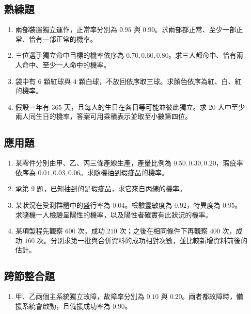 \documentclass[11pt,a4paper]{article}
\providecommand{\tightlist}{%
  \setlength{\itemsep}{0pt}\setlength{\parskip}{0pt}}
\begin{document}
\subsection{熟練題}\label{ux719fux7df4ux984c}

\begin{enumerate}
\def\labelenumi{\arabic{enumi}.}
\setcounter{enumi}{4}
\item
  兩部裝置獨立運作，正常率分別為 \(0.95\) 與 \(0.90\)。求兩部都正常、至少一部正常、恰有一部正常的機率。
\item
  三位選手獨立命中目標的機率依序為 \(0.70,0.60,0.80\)。求三人都命中、恰有兩人命中、至少一人命中的機率。
\item
  袋中有 \(6\) 顆紅球與 \(4\) 顆白球，不放回依序取三球。求顏色依序為紅、白、紅的機率。
\item
  假設一年有 \(365\) 天，且每人的生日在各日等可能並彼此獨立。求 \(20\) 人中至少兩人同生日的機率，答案可用乘積表示並取至小數第四位。
\end{enumerate}

\subsection{應用題}\label{ux61c9ux7528ux984c}

\begin{enumerate}
\def\labelenumi{\arabic{enumi}.}
\setcounter{enumi}{8}
\item
  某零件分別由甲、乙、丙三條產線生產，產量比例為 \(0.50,0.30,0.20\)，瑕疵率依序為 \(0.01,0.03,0.06\)。求隨機抽到瑕疵品的機率。
\item
  承第 9 題，已知抽到的是瑕疵品，求它來自丙線的機率。
\item
  某狀況在受測群體中的盛行率為 \(0.04\)。檢驗靈敏度為 \(0.92\)，特異度為 \(0.95\)。求隨機一人檢驗呈陽性的機率，以及陽性者確實有此狀況的機率。
\item
  某項製程先觀察 \(600\) 次，成功 \(210\) 次；之後在相同條件下再觀察 \(400\) 次，成功 \(160\) 次。分別求第一批與合併資料的成功相對次數，並比較新增資料前後的估計。
\end{enumerate}

\subsection{跨節整合題}\label{ux8de8ux7bc0ux6574ux5408ux984c}

\begin{enumerate}
\def\labelenumi{\arabic{enumi}.}
\setcounter{enumi}{12}
\tightlist
\item
  甲、乙兩個主系統獨立故障，故障率分別為 \(0.10\) 與 \(0.20\)。兩者都故障時，備援系統會啟動，且備援成功率為 \(0.90\)。
\end{enumerate}
\end{document}
